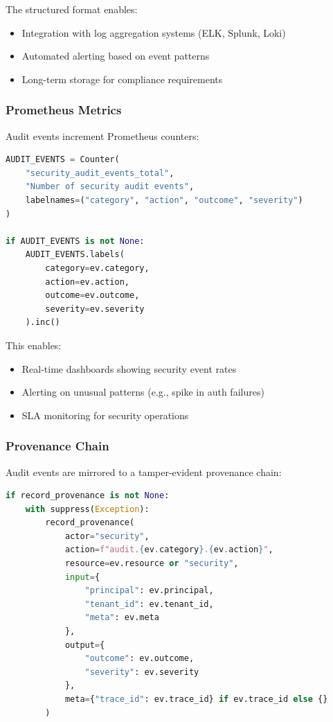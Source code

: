 The structured format enables:
\begin{itemize}
    \item Integration with log aggregation systems (ELK, Splunk, Loki)
    \item Automated alerting based on event patterns
    \item Long-term storage for compliance requirements
\end{itemize}

\subsubsection{Prometheus Metrics}

Audit events increment Prometheus counters:

\begin{lstlisting}[language=Python,caption={Prometheus metrics for audit events}]
AUDIT_EVENTS = Counter(
    "security_audit_events_total",
    "Number of security audit events",
    labelnames=("category", "action", "outcome", "severity")
)

if AUDIT_EVENTS is not None:
    AUDIT_EVENTS.labels(
        category=ev.category, 
        action=ev.action, 
        outcome=ev.outcome, 
        severity=ev.severity
    ).inc()
\end{lstlisting}

This enables:
\begin{itemize}
    \item Real-time dashboards showing security event rates
    \item Alerting on unusual patterns (e.g., spike in auth failures)
    \item SLA monitoring for security operations
\end{itemize}

\subsubsection{Provenance Chain}

Audit events are mirrored to a tamper-evident provenance chain:

\begin{lstlisting}[language=Python,caption={Provenance chain integration}]
if record_provenance is not None:
    with suppress(Exception):
        record_provenance(
            actor="security",
            action=f"audit.{ev.category}.{ev.action}",
            resource=ev.resource or "security",
            input={
                "principal": ev.principal, 
                "tenant_id": ev.tenant_id, 
                "meta": ev.meta
            },
            output={
                "outcome": ev.outcome, 
                "severity": ev.severity
            },
            meta={"trace_id": ev.trace_id} if ev.trace_id else {}
        )
\end{lstlisting}

